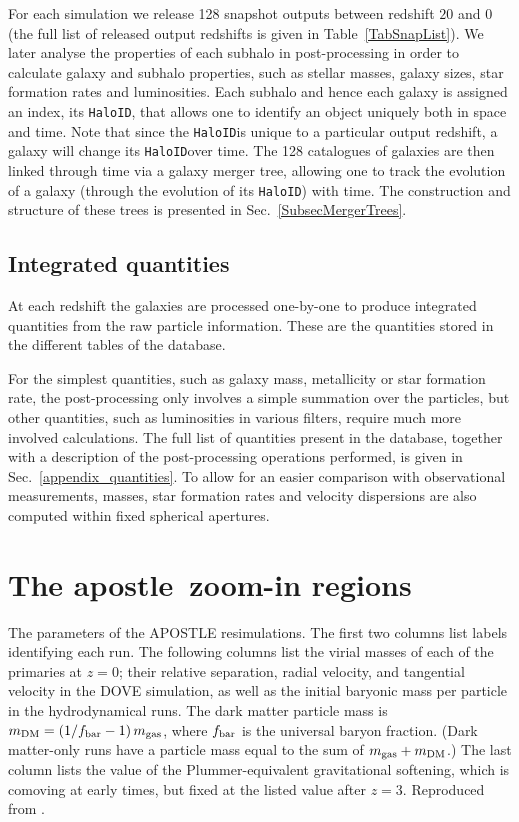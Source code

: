 \documentclass[10pt, a4paper]{article}
\newcommand{\apostle}{{\sc apostle}}
\newcommand{\HaloID}{{\texttt{HaloID}}}
\begin{document}
For each simulation we release 128 snapshot outputs between redshift $20$ and $0$ (the full list of released output redshifts is given in Table~\ref{TabSnapList}). We later analyse the properties of each subhalo in post-processing in order to calculate galaxy and subhalo properties, such as stellar masses, galaxy sizes, star formation rates and luminosities. Each subhalo and hence each galaxy is assigned an index, its \HaloID, that allows one to identify an object uniquely both in space and time. Note that since the \HaloID is unique to a particular output redshift, a galaxy will change its \HaloID over time. The 128 catalogues of galaxies are then linked through time via a galaxy merger tree, allowing one to track the evolution of a galaxy (through the evolution of its \HaloID) with time. The construction and structure of these trees is presented in Sec.~\ref{SubsecMergerTrees}.

\subsection{Integrated quantities}
At each redshift the galaxies are processed one-by-one to produce integrated quantities from the raw particle information. These are the quantities stored in the different tables of the database.

For the simplest quantities, such as galaxy mass, metallicity or star formation rate, the post-processing only involves a simple summation over the particles, but other quantities, such as luminosities in various filters, require much more involved calculations. The full list of quantities present in the database, together with a description of the post-processing operations performed, is given in Sec.~\ref{appendix_quantities}. To allow for an easier comparison with observational measurements, masses, star formation rates and velocity dispersions are also computed within fixed spherical apertures.

\section{The \apostle\ zoom-in regions}

\begin{table}
\caption{The parameters of the {\small APOSTLE} resimulations. The first two columns list labels identifying each run. The following columns list the virial masses of each of the primaries at $z=0$; their relative separation, radial velocity, and tangential velocity in the {\small DOVE} simulation, as well as the initial baryonic mass per particle in the hydrodynamical runs. The dark matter particle mass is $m_{\rm DM}=(1/f_{\rm bar}-1) \, m_{\rm gas}$, where $f_{\rm bar}$ is the universal baryon fraction. (Dark matter-only runs have a particle mass equal to the sum of $m_{\rm gas}+m_{\rm DM}$.) The last column lists the value of the Plummer-equivalent gravitational softening, which is comoving at early times, but fixed at the listed value after $z=3$. Reproduced from \cite{2016MNRAS.457..844F}.}
\vspace{5pt}
\centering
\footnotesize

\label{TabLGSims}
\end{table}
\end{document}
